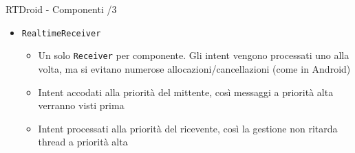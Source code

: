 \begin{frame}{RTDroid - Componenti /3}
	\begin{itemize}
		\item \texttt{RealtimeReceiver}
		\begin{itemize}
			\item Un solo \texttt{Receiver} per componente. Gli intent vengono processati uno alla volta, ma si evitano numerose allocazioni/cancellazioni (come in Android)
			\item Intent accodati alla priorità del mittente, così messaggi a priorità alta verranno visti prima
			\item Intent processati alla priorità del ricevente, così la gestione non ritarda thread a priorità alta
		\end{itemize}
	\end{itemize}
\end{frame}